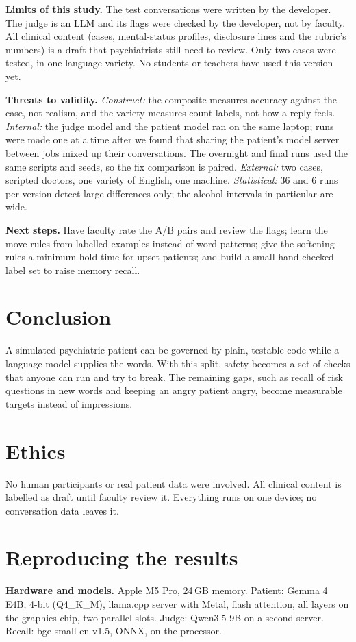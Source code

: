 \documentclass[journal]{IEEEtran}
\begin{document}
\textbf{Limits of this study.} The test conversations were written by the developer. The judge is an LLM and its flags were checked by the
developer, not by faculty. All clinical content (cases, mental-status profiles, disclosure lines and the rubric's numbers) is a draft that
psychiatrists still need to review. Only two cases were tested, in one language variety. No students or teachers have used this version yet.

\textbf{Threats to validity.} \emph{Construct:} the composite measures accuracy against the case, not realism, and the variety measures
count labels, not how a reply feels. \emph{Internal:} the judge model and the patient model ran on the same laptop; runs were made one at a
time after we found that sharing the patient's model server between jobs mixed up their conversations. The overnight and final runs used the
same scripts and seeds, so the fix comparison is paired. \emph{External:} two cases, scripted doctors, one variety of English, one machine.
\emph{Statistical:} 36 and 6 runs per version detect large differences only; the alcohol intervals in particular are wide.

\textbf{Next steps.} Have faculty rate the A/B pairs and review the flags; learn the move rules from labelled examples instead of word patterns;
give the softening rules a minimum hold time for upset patients; and build a small hand-checked label set to raise memory recall.

\section{Conclusion}
A simulated psychiatric patient can be governed by plain, testable code while a language model supplies the words. With this split, safety becomes a set of checks that anyone can run and try to break. The remaining gaps, such as recall of risk questions in new words and keeping an angry patient angry, become measurable targets instead of impressions.

\section*{Ethics}
No human participants or real patient data were involved. All clinical content is labelled as draft until faculty review it. Everything runs on
one device; no conversation data leaves it.

\appendices
\section{Reproducing the results}
\textbf{Hardware and models.} Apple M5 Pro, 24\,GB memory. Patient: Gemma 4 E4B, 4-bit (Q4\_K\_M), llama.cpp server with Metal, flash
attention, all layers on the graphics chip, two parallel slots. Judge: Qwen3.5-9B on a second server. Recall: bge-small-en-v1.5, ONNX, on the
processor.
\end{document}
